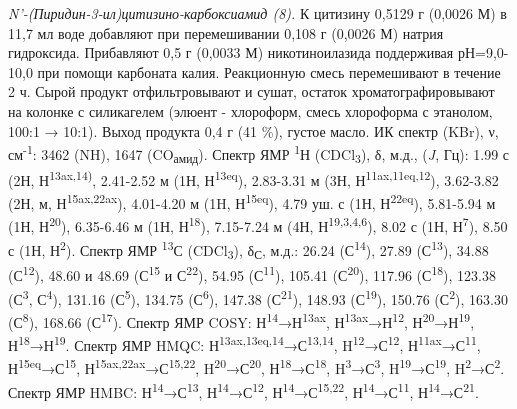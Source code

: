 \emph{N'-(Пиридин-3-ил)цитизино-карбоксиамид (8).} К цитизину 0,5129 г
(0,0026 М) в 11,7 мл воде добавляют при перемешивании 0,108 г (0,0026 М)
натрия гидроксида. Прибавляют 0,5 г (0,0033 М) никотиноилазида
поддерживая рН=9,0-10,0 при помощи карбоната калия. Реакционную смесь
перемешивают в течение 2 ч. Сырой продукт отфильтровывают и сушат,
остаток хроматографировывают на колонке с силикагелем (элюент -
хлороформ, смесь хлороформа с этанолом, 100:1 → 10:1). Выход продукта
0,4 г (41 \%), густое масло. ИК спектр (KBr), ν, см\textsuperscript{-1}:
3462 (NH), 1647 (CO\textsubscript{амид}). Спектр ЯМР
\textsuperscript{1}Н (CDCl\textsubscript{3}), δ, м.д., (\emph{J}, Гц):
1.99 с (2Н, Н\textsuperscript{13ax,14)}, 2.41-2.52 м (1Н,
Н\textsuperscript{13eq}), 2.83-3.31 м (3Н,
Н\textsuperscript{11ax,11eq,12}), 3.62-3.82 (2Н, м,
Н\textsuperscript{15ax,22ax}), 4.01-4.20 м (1H,
Н\textsuperscript{15eq}), 4.79 уш. с (1Н, Н\textsuperscript{22eq}),
5.81-5.94 м (1Н, Н\textsuperscript{20}), 6.35-6.46 м (1Н,
Н\textsuperscript{18}), 7.15-7.24 м (4Н, Н\textsuperscript{19,3,4,6}),
8.02 с (1Н, Н\textsuperscript{7}), 8.50 с (1Н, Н\textsuperscript{2}).
Спектр ЯМР \textsuperscript{13}С (CDCl\textsubscript{3}),
δ\textsubscript{С}, м.д.: 26.24 (С\textsuperscript{14}), 27.89
(С\textsuperscript{13}), 34.88 (С\textsuperscript{12}), 48.60 и 48.69
(С\textsuperscript{15} и С\textsuperscript{22}), 54.95
(С\textsuperscript{11}), 105.41 (С\textsuperscript{20}), 117.96
(С\textsuperscript{18}), 123.38 (С\textsuperscript{3},
С\textsuperscript{4}), 131.16 (С\textsuperscript{5}), 134.75
(С\textsuperscript{6}), 147.38 (С\textsuperscript{21}), 148.93
(С\textsuperscript{19}), 150.76 (С\textsuperscript{2}), 163.30
(С\textsuperscript{8}), 168.66 (С\textsuperscript{17}). Спектр ЯМР COSY:
Н\textsuperscript{14}→Н\textsuperscript{13ax},
Н\textsuperscript{13ax}→Н\textsuperscript{12},
Н\textsuperscript{20}→Н\textsuperscript{19},
Н\textsuperscript{18}→Н\textsuperscript{19}. Спектр ЯМР HMQC:
Н\textsuperscript{13ax,13eq,14}→С\textsuperscript{13,14},
H\textsuperscript{12}→С\textsuperscript{12},
Н\textsuperscript{11ax}→С\textsuperscript{11},
Н\textsuperscript{15eq}→С\textsuperscript{15},
Н\textsuperscript{15ax,22ax}→С\textsuperscript{15,22},
H\textsuperscript{20}→С\textsuperscript{20},
Н\textsuperscript{18}→С\textsuperscript{18},
H\textsuperscript{3}→С\textsuperscript{3},
H\textsuperscript{19}→С\textsuperscript{19},
H\textsuperscript{2}→С\textsuperscript{2}. Спектр ЯМР HMBC:
Н\textsuperscript{14}→С\textsuperscript{13},
Н\textsuperscript{14}→С\textsuperscript{12},
Н\textsuperscript{14}→С\textsuperscript{15,22},
Н\textsuperscript{14}→С\textsuperscript{11},
Н\textsuperscript{14}→С\textsuperscript{21}.


